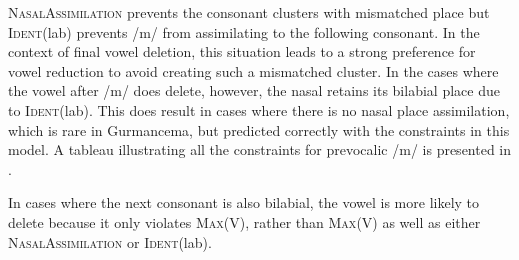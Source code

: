 \documentclass[output=paper,newtxmath,modfonts,nonflat,draftmode]{langsci/langscibook}
\begin{document}
\textsc{NasalAssimilation} prevents the consonant clusters with mismatched place but \textsc{Ident}(lab) prevents /m/ from assimilating to the following consonant. In the context of final vowel deletion, this situation leads to a strong preference for vowel reduction to avoid creating such a mismatched cluster.  In the cases where the vowel after /m/ does delete, however, the nasal retains its bilabial place due to \textsc{Ident}(lab). This does result in cases where there is no nasal place assimilation, which is rare in Gurmancema, but predicted correctly with the constraints in this model. 
A tableau illustrating all the constraints for prevocalic /m/ is presented in . 


\begin{table}
\caption{Tableau for /mi\#C/ with sample phrase ‘elephants eat’, $n=44$}
\label{tab:baird:8}
\footnotesize
{}
\end{table}

In cases where the next consonant is also bilabial, the vowel is more likely to delete because it only violates \textsc{Max}(V), rather than \textsc{Max}(V) as well as either \textsc{NasalAssimilation} or \textsc{Ident}(lab). 
\end{document}
